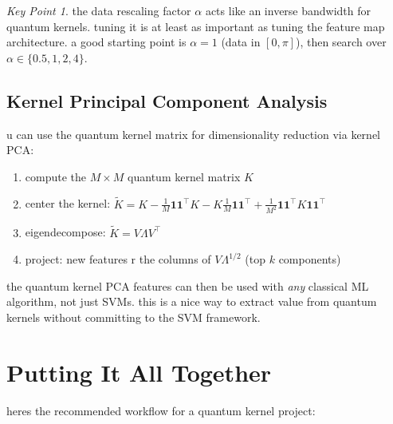 \documentclass[11pt,a4paper]{article}
\theoremstyle{definition}
\theoremstyle{remark}
\newtheorem*{keypoint}{Key Point}
\begin{document}
\begin{keypoint}
the data rescaling factor $\alpha$ acts like an inverse bandwidth for quantum kernels. tuning it is at least as important as tuning the feature map architecture. a good starting point is $\alpha = 1$ (data in $[0, \pi]$), then search over $\alpha \in \{0.5, 1, 2, 4\}$.
\end{keypoint}

\subsection{Kernel Principal Component Analysis}

u can use the quantum kernel matrix for dimensionality reduction via kernel PCA:

\begin{enumerate}[leftmargin=*]
    \item compute the $M \times M$ quantum kernel matrix $K$
    \item center the kernel: $\tilde{K} = K - \frac{1}{M}\mathbf{1}\mathbf{1}^\top K - K \frac{1}{M}\mathbf{1}\mathbf{1}^\top + \frac{1}{M^2}\mathbf{1}\mathbf{1}^\top K \mathbf{1}\mathbf{1}^\top$
    \item eigendecompose: $\tilde{K} = V \Lambda V^\top$
    \item project: new features r the columns of $V \Lambda^{1/2}$ (top $k$ components)
\end{enumerate}

the quantum kernel PCA features can then be used with \emph{any} classical ML algorithm, not just SVMs. this is a nice way to extract value from quantum kernels without committing to the SVM framework.

\section{Putting It All Together}

heres the recommended workflow for a quantum kernel project:
\end{document}
